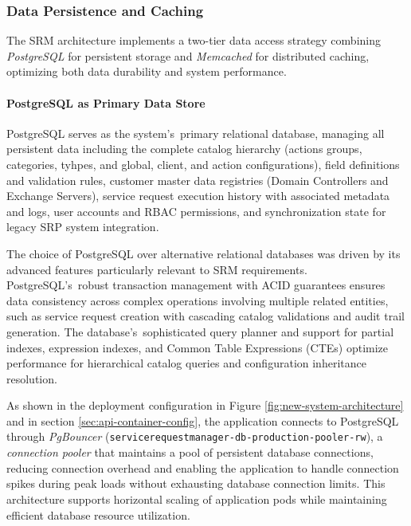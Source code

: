 \subsubsection{Data Persistence and Caching}

The SRM architecture implements a two-tier data access strategy combining \textit{PostgreSQL} for persistent storage and \textit{Memcached} for distributed caching, optimizing both data durability and system performance.

\paragraph{PostgreSQL as Primary Data Store}

PostgreSQL serves as the system's~primary relational database, managing all persistent data including the complete catalog hierarchy (actions groups, categories, tyhpes, and global, client, and action configurations), field definitions and validation rules, customer master data registries (Domain Controllers and Exchange Servers), service request execution history with associated metadata and logs, user accounts and RBAC permissions, and synchronization state for legacy SRP system integration.

The choice of PostgreSQL over alternative relational databases was driven by its advanced features particularly relevant to SRM requirements. PostgreSQL's~robust transaction management with ACID guarantees ensures data consistency across complex operations involving multiple related entities, such as service request creation with cascading catalog validations and audit trail generation. The database's~sophisticated query planner and support for partial indexes, expression indexes, and Common Table Expressions (CTEs) optimize performance for hierarchical catalog queries and configuration inheritance resolution.

As shown in the deployment configuration in Figure \ref{fig:new-system-architecture} and in section \ref{sec:api-container-config}, the application connects to PostgreSQL through \textit{PgBouncer} (\texttt{servicerequestmanager-db-production-pooler-rw}), a \textit{connection pooler} that maintains a pool of persistent database connections, reducing connection overhead and enabling the application to handle connection spikes during peak loads without exhausting database connection limits. This architecture supports horizontal scaling of application pods while maintaining efficient database resource utilization.

